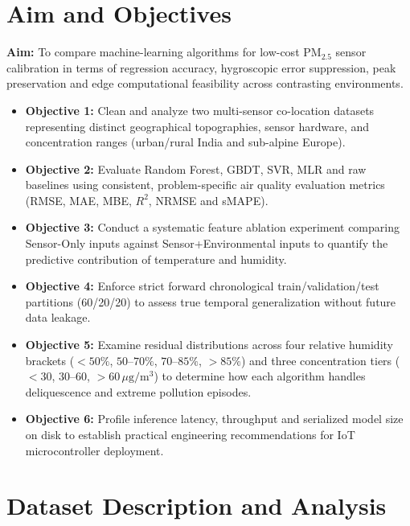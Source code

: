 \documentclass[11pt,a4paper]{article}
\begin{document}
\section{Aim and Objectives}
\textbf{Aim:} To compare machine-learning algorithms for low-cost $\text{PM}_{2.5}$ sensor calibration in terms of regression accuracy, hygroscopic error suppression, peak preservation and edge computational feasibility across contrasting environments.

\begin{itemize}
    \item \textbf{Objective 1:} Clean and analyze two multi-sensor co-location datasets representing distinct geographical topographies, sensor hardware, and concentration ranges (urban/rural India and sub-alpine Europe).
    \item \textbf{Objective 2:} Evaluate Random Forest, GBDT, SVR, MLR and raw baselines using consistent, problem-specific air quality evaluation metrics (RMSE, MAE, MBE, $R^2$, NRMSE and sMAPE).
    \item \textbf{Objective 3:} Conduct a systematic feature ablation experiment comparing Sensor-Only inputs against Sensor+Environmental inputs to quantify the predictive contribution of temperature and humidity.
    \item \textbf{Objective 4:} Enforce strict forward chronological train/validation/test partitions (60/20/20) to assess true temporal generalization without future data leakage.
    \item \textbf{Objective 5:} Examine residual distributions across four relative humidity brackets ($<50\%$, $50\text{--}70\%$, $70\text{--}85\%$, $>85\%$) and three concentration tiers ($<30$, $30\text{--}60$, $>60\,\mu\text{g}/\text{m}^3$) to determine how each algorithm handles deliquescence and extreme pollution episodes.
    \item \textbf{Objective 6:} Profile inference latency, throughput and serialized model size on disk to establish practical engineering recommendations for IoT microcontroller deployment.
\end{itemize}

\section{Dataset Description and Analysis}
\end{document}
